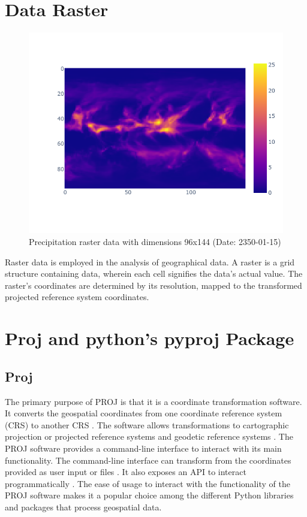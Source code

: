 \section{Data Raster}
\begin{figure}[H]
    \centering
    \includegraphics[width=0.75\linewidth]{figures/chapter-5/precipitation_raster.png}
    \caption{Precipitation raster data with dimensions 96x144 (Date: 2350-01-15)}
    \label{fig:precipitation-raster}
\end{figure}
Raster data is employed in the analysis of geographical data. A raster is a grid structure containing data, wherein each cell signifies the data's actual value. The raster's coordinates are determined by its resolution, mapped to the transformed projected reference system coordinates.


\section{Proj and python's pyproj Package}
\label{section:proj}

\subsection{Proj}

The primary purpose of PROJ is that it is a coordinate transformation
software. It converts the geospatial coordinates from one coordinate reference system (CRS) to another CRS \cite{PROJ_SITE}.
The software allows transformations to cartographic projection or projected reference systems and geodetic reference systems \cite{PROJ_SITE}.
The PROJ software provides a command-line interface to interact with its main functionality\cite{PROJ_SITE}.
The command-line interface can transform from the coordinates provided as user input or files \cite{PROJ_SITE}.
It also exposes an API to interact programmatically \cite{PROJ_SITE}. The ease of usage to interact with the functionality of the PROJ software makes it a popular choice among the different Python libraries and packages that process geospatial data.

